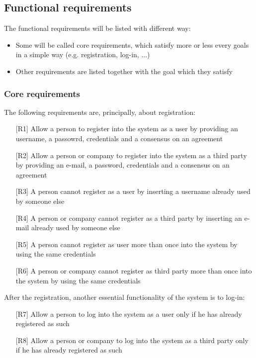 \subsection{Functional requirements}
\par
The functional requirements will be listed with different way:
\begin{itemize}
\item Some will be called core requirements, which satisfy more or less every goals in a simple way (e.g. registration, log-in, ...)
\item Other requirements are listed together with the goal which they satisfy
\end{itemize}

\subsubsection{Core requirements}
\par
The following requirements are, principally, about registration:
\begin{itemize}
\item[{[R1]}] Allow a person to register into the system as a user by providing an username, a passowrd, credentials and a consensus on an agreement
\item[{[R2]}] Allow a person or company to register into the system as a third party by providing an e-mail, a password, credentials and a consensus on an agreement
\item[{[R3]}] A person cannot register as a user by inserting a username already used by someone else
\item[{[R4]}] A person or company cannot register as a third party by inserting an e-mail already used by someone else
\item[{[R5]}] A person cannot register as user more than once into the system by using the same credentials
\item[{[R6]}] A person or company cannot register as third party more than once into the system by using the same credentials
\end{itemize}
\par
After the registration, another essential functionality of the system is to log-in:
\begin{itemize}
\item[{[R7]}] Allow a person to log into the system as a user only if he has already registered as such
\item[{[R8]}] Allow a person or company to log into the system as a third party only if he has already registered as such
\end{itemize}

